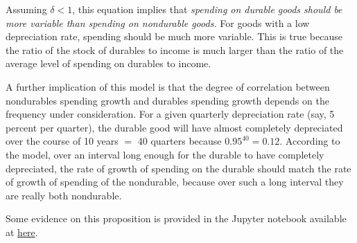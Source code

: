 \documentclass{handout}
\begin{document}
Assuming $\delta < 1$, this equation implies that {\it spending on 
durable goods should be more variable than spending on nondurable 
goods.} For goods with a low depreciation rate, spending should be 
much more variable.  This is true because the ratio of the stock of 
durables to income is much larger than the ratio of the average level 
of spending on durables to income.

A further implication of this model is that the degree of correlation between nondurables spending growth and durables spending growth
depends on the frequency under consideration.  For a given quarterly depreciation rate (say, 5 percent per quarter), the durable good will have almost completely depreciated over the course of 10 years $=$ 40 quarters because $0.95^{40}=0.12$.  According to the model, over an interval long enough for the durable to have completely depreciated, the rate of growth of spending on the durable should match the rate of growth of spending of the nondurable, because over such a long interval they are really both nondurable.

Some evidence on this proposition is provided in the Jupyter notebook available at \href{https://github.com/llorracc/Jupyter/blob/master/notebooks/Durables-vs-Nondurables-At-Low-And-High-Frequencies.ipynb}{here}.

 

\end{document}
